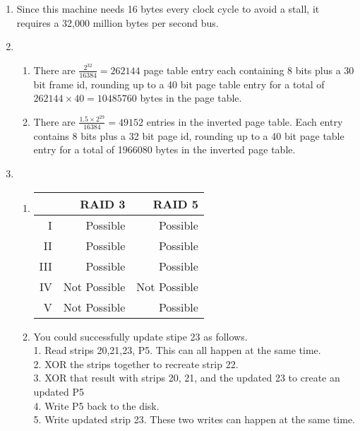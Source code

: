 \documentclass[11pt,fleqn]{article}
\begin{document}
\begin{enumerate}
\begin{enumerate}
 \end{enumerate}
\item %
    Since this machine needs 16 bytes every clock cycle to avoid a stall, it requires a 32,000 million bytes per second bus. 
\item %
\begin{enumerate}
\item There are $ \frac{2^{32}}{16384} = 262144$ page table entry each containing 8 bits plus a 30 bit frame id, rounding up to a 40 bit page table entry for a total of $262144 \times 40 = 10485760$ bytes in the page table.
\item There are $ \frac{1.5 \times 2^{29}}{16384} = 49152$ entries in the inverted page table. Each entry contains 8 bits plus a 32 bit page id, rounding up to a 40 bit page table entry for a total of 1966080 bytes in the inverted page table. 
\end{enumerate}
\item %
\begin{enumerate}
\item
\begin{tabular}{|r|r|r|}
  \hline
	 & RAID 3 & RAID 5 \\ 
\hline
  I & Possible & Possible \\
 II & Possible & Possible \\
 III & Possible & Possible \\ 
IV & Not Possible & Not Possible \\
V & Not Possible & Possible \\
\hline
\end{tabular}
\item 
You could successfully update stipe 23 as follows.  \\
1. Read strips 20,21,23, P5. This can all happen at the same time. \\
2. XOR the strips together to recreate strip 22.\\
3. XOR that result with strips 20, 21, and the updated 23 to create an updated P5\\
4. Write P5 back to the disk. \\
5. Write updated strip 23. These two writes can happen at the same time. \\
\end{enumerate}
\end{enumerate}
\end{document}

